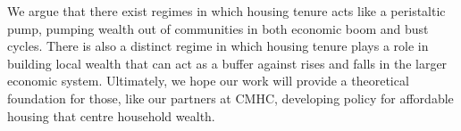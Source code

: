We argue that there exist regimes in which housing tenure acts like a peristaltic pump, pumping wealth out of communities in both economic boom and bust cycles. There is also a distinct regime in which housing tenure plays a role in building local wealth that can act as a buffer against rises and falls in the larger economic system. Ultimately, we hope our work will provide a theoretical foundation for those, like our partners at CMHC, developing policy for affordable housing that centre household wealth. 

